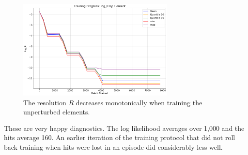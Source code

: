 \begin{figure}[hbt!]
\begin{center}
\includegraphics[width=0.7\textwidth]{../figs/search_known/unperturbed/learning_curve_log_R.png}
\end{center}
\caption[The resolution $R$ decreases monotonically when training the unperturbed elements]
{The resolution $R$ decreases monotonically when training the unperturbed elements.}
\label{fig:TrainUnperturbedRes}
\end{figure}
These are very happy diagnostics.  The log likelihood averages over 1,000 and the hits average 160.
An earlier iteration of the training protocol that did not roll back training when hits were 
lost in an episode did considerably less well.

